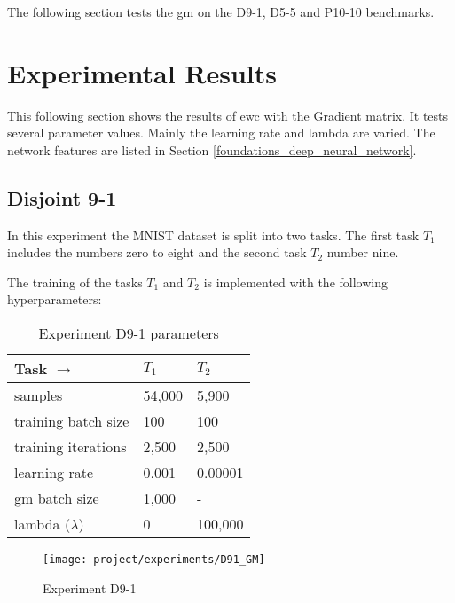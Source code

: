 The following section tests the \acrlong{gm} on the D9-1, D5-5 and P10-10 benchmarks.

\newpage
\section{Experimental Results}

This following section shows the results of \acrshort{ewc} with the Gradient matrix.
It tests several parameter values.
Mainly the learning rate and lambda are varied.
The network features are listed in Section \ref{foundations_deep_neural_network}.

\subsection{Disjoint 9-1}

In this experiment the MNIST dataset is split into two tasks.
The first task $T_1$ includes the numbers zero to eight and the second task $T_2$ number nine.

The training of the tasks $T_1$ and $T_2$ is implemented with the following hyperparameters:

\begin{table}[H]
    \centering
    \begin{tabular}{ |l|l|l|  }
        \hline
        Task $\to$ & $T_1$ & $T_2$ \\
        \hline\hline
        samples & 54,000 & 5,900 \\
        \hline
        training batch size & 100 & 100 \\
        \hline
        training iterations & 2,500 & 2,500 \\
        \hline
        learning rate & 0.001 & 0.00001 \\
        \hline
        \acrshort{gm} batch size & 1,000 & - \\
        \hline
        lambda ($\lambda$) & 0 & 100,000 \\
        \hline
    \end{tabular}
    \caption{Experiment D9-1 parameters}
    \label{table:exp_d91_params}
\end{table}

\begin{figure}[H]
    \centering
    \texttt{[image: project/experiments/D91\_GM]}
    \caption{Experiment D9-1}
    \label{fig:exp_d9-1_bs1k}
\end{figure}

